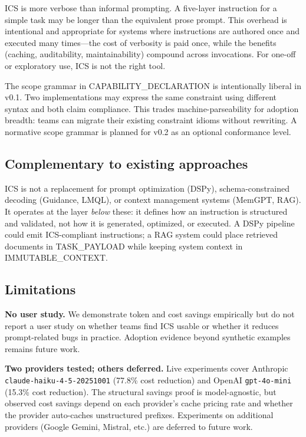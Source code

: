 \documentclass[11pt]{article}
\begin{document}
ICS is more verbose than informal prompting. A five-layer instruction for a
simple task may be longer than the equivalent prose prompt. This overhead is
intentional and appropriate for systems where instructions are authored once
and executed many times---the cost of verbosity is paid once, while the
benefits (caching, auditability, maintainability) compound across invocations.
For one-off or exploratory use, ICS is not the right tool.

The scope grammar in CAPABILITY\_DECLARATION is intentionally liberal in
v0.1. Two implementations may express the same constraint using different
syntax and both claim compliance. This trades machine-parseability for
adoption breadth: teams can migrate their existing constraint idioms without
rewriting. A normative scope grammar is planned for v0.2 as an optional
conformance level.

\subsection{Complementary to existing approaches}
\label{sec:complementary}

ICS is not a replacement for prompt optimization (DSPy), schema-constrained
decoding (Guidance, LMQL), or context management systems (MemGPT, RAG). It
operates at the layer \emph{below} these: it defines how an instruction is
structured and validated, not how it is generated, optimized, or executed.
A DSPy pipeline could emit ICS-compliant instructions; a RAG system could
place retrieved documents in TASK\_PAYLOAD while keeping system context in
IMMUTABLE\_CONTEXT.

\subsection{Limitations}
\label{sec:limits}

\textbf{No user study.} We demonstrate token and cost savings empirically but
do not report a user study on whether teams find ICS usable or whether it
reduces prompt-related bugs in practice. Adoption evidence beyond synthetic
examples remains future work.

\textbf{Two providers tested; others deferred.} Live experiments cover
Anthropic \texttt{claude-haiku-4-5-20251001} (77.8\% cost reduction) and
OpenAI \texttt{gpt-4o-mini} (15.3\% cost reduction). The structural savings
proof is model-agnostic, but observed cost savings depend on each provider's
cache pricing rate and whether the provider auto-caches unstructured prefixes.
Experiments on additional providers (Google Gemini, Mistral, etc.) are
deferred to future work.
\end{document}

